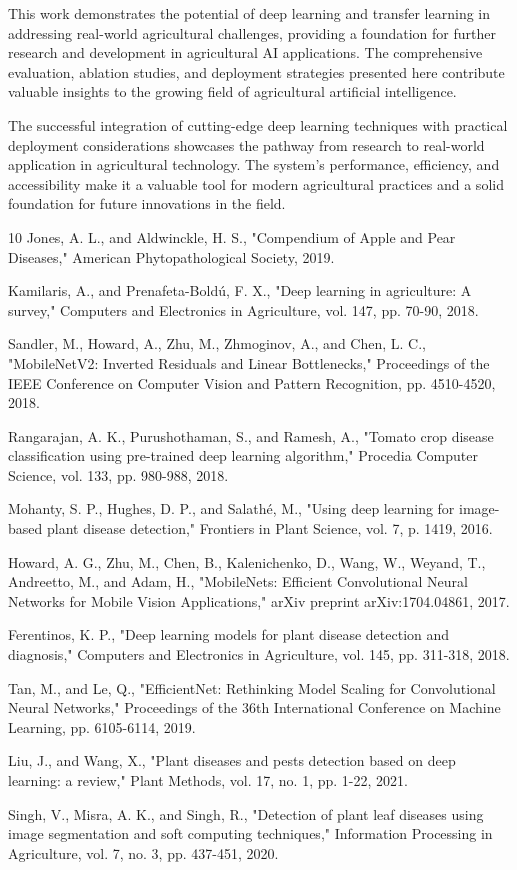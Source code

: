 \documentclass[conference,10pt,letterpaper]{IEEEtran}
\begin{document}
This work demonstrates the potential of deep learning and transfer learning in addressing real-world agricultural challenges, providing a foundation for further research and development in agricultural AI applications. The comprehensive evaluation, ablation studies, and deployment strategies presented here contribute valuable insights to the growing field of agricultural artificial intelligence.

The successful integration of cutting-edge deep learning techniques with practical deployment considerations showcases the pathway from research to real-world application in agricultural technology. The system's performance, efficiency, and accessibility make it a valuable tool for modern agricultural practices and a solid foundation for future innovations in the field.

\begin{thebibliography}{10}
 Jones, A. L., and Aldwinckle, H. S., "Compendium of Apple and Pear Diseases," American Phytopathological Society, 2019.

 Kamilaris, A., and Prenafeta-Boldú, F. X., "Deep learning in agriculture: A survey," Computers and Electronics in Agriculture, vol. 147, pp. 70-90, 2018.

 Sandler, M., Howard, A., Zhu, M., Zhmoginov, A., and Chen, L. C., "MobileNetV2: Inverted Residuals and Linear Bottlenecks," Proceedings of the IEEE Conference on Computer Vision and Pattern Recognition, pp. 4510-4520, 2018.

 Rangarajan, A. K., Purushothaman, S., and Ramesh, A., "Tomato crop disease classification using pre-trained deep learning algorithm," Procedia Computer Science, vol. 133, pp. 980-988, 2018.

 Mohanty, S. P., Hughes, D. P., and Salathé, M., "Using deep learning for image-based plant disease detection," Frontiers in Plant Science, vol. 7, p. 1419, 2016.

 Howard, A. G., Zhu, M., Chen, B., Kalenichenko, D., Wang, W., Weyand, T., Andreetto, M., and Adam, H., "MobileNets: Efficient Convolutional Neural Networks for Mobile Vision Applications," arXiv preprint arXiv:1704.04861, 2017.

 Ferentinos, K. P., "Deep learning models for plant disease detection and diagnosis," Computers and Electronics in Agriculture, vol. 145, pp. 311-318, 2018.

 Tan, M., and Le, Q., "EfficientNet: Rethinking Model Scaling for Convolutional Neural Networks," Proceedings of the 36th International Conference on Machine Learning, pp. 6105-6114, 2019.

 Liu, J., and Wang, X., "Plant diseases and pests detection based on deep learning: a review," Plant Methods, vol. 17, no. 1, pp. 1-22, 2021.

 Singh, V., Misra, A. K., and Singh, R., "Detection of plant leaf diseases using image segmentation and soft computing techniques," Information Processing in Agriculture, vol. 7, no. 3, pp. 437-451, 2020.
\end{thebibliography}
\end{document}
